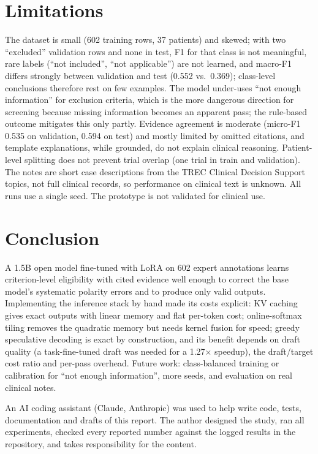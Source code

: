 \documentclass[conference]{IEEEtran}
\begin{document}
\section{Limitations}
The dataset is small (602 training rows, 37 patients) and skewed; with two ``excluded'' validation rows and none in test, F1 for that class is not meaningful, rare labels (``not included'', ``not applicable'') are not learned, and macro-F1 differs strongly between validation and test (0.552 vs.\ 0.369); class-level conclusions therefore rest on few examples. The model under-uses ``not enough information'' for exclusion criteria, which is the more dangerous direction for screening because missing information becomes an apparent pass; the rule-based outcome mitigates this only partly. Evidence agreement is moderate (micro-F1 0.535 on validation, 0.594 on test) and mostly limited by omitted citations, and template explanations, while grounded, do not explain clinical reasoning. Patient-level splitting does not prevent trial overlap (one trial in train and validation). The notes are short case descriptions from the TREC Clinical Decision Support topics, not full clinical records, so performance on clinical text is unknown. All runs use a single seed. The prototype is not validated for clinical use.

\section{Conclusion}
A 1.5B open model fine-tuned with LoRA on 602 expert annotations learns criterion-level eligibility with cited evidence well enough to correct the base model's systematic polarity errors and to produce only valid outputs. Implementing the inference stack by hand made its costs explicit: KV caching gives exact outputs with linear memory and flat per-token cost; online-softmax tiling removes the quadratic memory but needs kernel fusion for speed; greedy speculative decoding is exact by construction, and its benefit depends on draft quality (a task-fine-tuned draft was needed for a 1.27$\times$ speedup), the draft/target cost ratio and per-pass overhead. Future work: class-balanced training or calibration for ``not enough information'', more seeds, and evaluation on real clinical notes.

An AI coding assistant (Claude, Anthropic) was used to help write code, tests, documentation and drafts of this report. The author designed the study, ran all experiments, checked every reported number against the logged results in the repository, and takes responsibility for the content.



\end{document}
